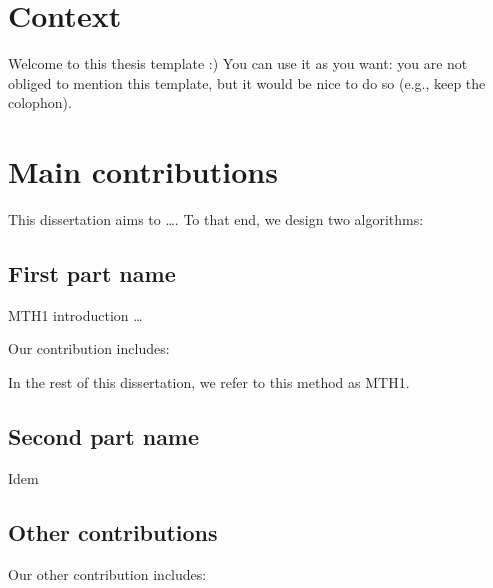 

\section{Context}
\label{sec:overview:context}

Welcome to this thesis template :) You can use it as you want: you are not obliged to mention this template, but it would be nice to do so (e.g., keep the colophon). 


\section{Main contributions}
\label{sec:overview:contributions}

This dissertation aims to …. To that end, we design two algorithms:


\subsection{First part name}

MTH1 introduction …

Our contribution includes:
\blinditemize[2]

\newthought{} In the rest of this dissertation, we refer to this method as MTH1.


\subsection{Second part name}

Idem


\subsection{Other contributions}

Our other contribution includes:
\blinditemize[2]



